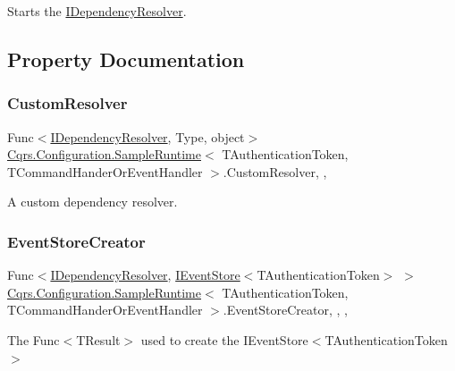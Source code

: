 Starts the \hyperlink{interfaceCqrs_1_1Configuration_1_1IDependencyResolver}{I\+Dependency\+Resolver}. 



\subsection{Property Documentation}
\mbox{\label{classCqrs_1_1Configuration_1_1SampleRuntime_abf9adc15d9a99c70ab60792c37a619f0_abf9adc15d9a99c70ab60792c37a619f0}} 
\subsubsection{\texorpdfstring{Custom\+Resolver}{CustomResolver}}
{\footnotesize\ttfamily Func$<$\hyperlink{interfaceCqrs_1_1Configuration_1_1IDependencyResolver}{I\+Dependency\+Resolver}, Type, object$>$ \hyperlink{classCqrs_1_1Configuration_1_1SampleRuntime}{Cqrs.\+Configuration.\+Sample\+Runtime}$<$ T\+Authentication\+Token, T\+Command\+Hander\+Or\+Event\+Handler $>$.Custom\+Resolver\hspace{0.3cm}{\ttfamily [static]}, {\ttfamily [get]}, {\ttfamily [set]}}



A custom dependency resolver. 

\mbox{\label{classCqrs_1_1Configuration_1_1SampleRuntime_a9038dd478bcafb2f5f65cbcbada712db_a9038dd478bcafb2f5f65cbcbada712db}} 
\subsubsection{\texorpdfstring{Event\+Store\+Creator}{EventStoreCreator}}
{\footnotesize\ttfamily Func$<$\hyperlink{interfaceCqrs_1_1Configuration_1_1IDependencyResolver}{I\+Dependency\+Resolver}, \hyperlink{interfaceCqrs_1_1Events_1_1IEventStore}{I\+Event\+Store}$<$T\+Authentication\+Token$>$ $>$ \hyperlink{classCqrs_1_1Configuration_1_1SampleRuntime}{Cqrs.\+Configuration.\+Sample\+Runtime}$<$ T\+Authentication\+Token, T\+Command\+Hander\+Or\+Event\+Handler $>$.Event\+Store\+Creator\hspace{0.3cm}{\ttfamily [static]}, {\ttfamily [get]}, {\ttfamily [set]}, {\ttfamily [protected]}}



The Func$<$\+T\+Result$>$ used to create the I\+Event\+Store$<$\+T\+Authentication\+Token$>$ 

